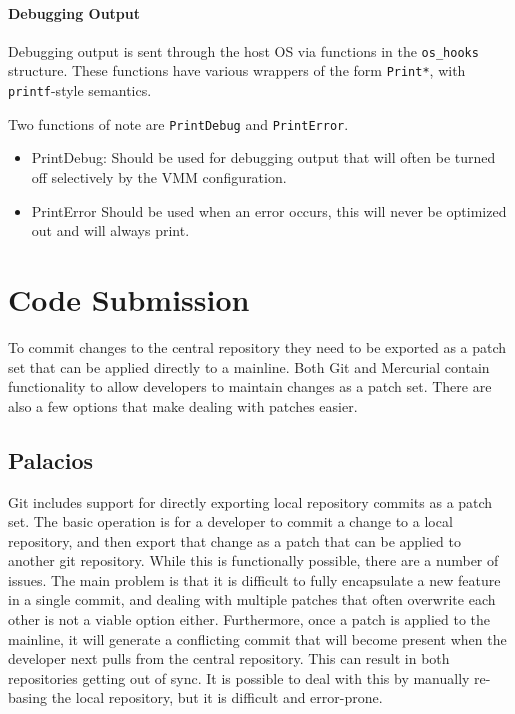\documentclass[11pt]{article}
\begin{document}
\paragraph*{Debugging Output}
Debugging output is sent through the host OS via functions in the
\verb.os_hooks. structure. These functions have various wrappers of the form
\verb.Print*., with \texttt{printf}-style semantics. 

Two functions of note are \verb.PrintDebug. and \verb.PrintError..

\begin{itemize}

\item PrintDebug:
\newline
Should be used for debugging output that will often be turned off
selectively by the VMM configuration.

\item PrintError
\newline
Should be used when an error occurs, this will never be optimized out
and will always print. 
\end{itemize}


\section{Code Submission}
\label{sec:submission}

To commit changes to the central repository they need to be exported
as a patch set that can be applied directly to a mainline. Both Git
and Mercurial contain functionality to allow developers to maintain
changes as a patch set. There are also a few options that make dealing
with patches easier.

\subsection{Palacios}

Git includes support for directly exporting local repository commits
as a patch set. The basic operation is for a developer to commit a
change to a local repository, and then export that change as a patch
that can be applied to another git repository. While this is
functionally possible, there are a number of issues. The main problem
is that it is difficult to fully encapsulate a new feature in a single
commit, and dealing with multiple patches that often overwrite each
other is not a viable option either. Furthermore, once a patch is
applied to the mainline, it will generate a conflicting commit that
will become present when the developer next pulls from the central
repository. This can result in both repositories getting out of
sync. It is possible to deal with this by manually re-basing the local
repository, but it is difficult and error-prone. 
\end{document}
